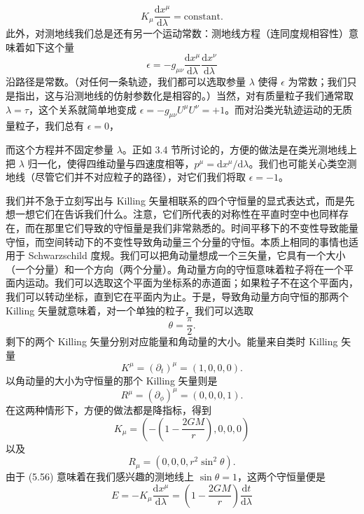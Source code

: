 \begin{equation*}
K_\mu\frac{\mathrm{d}x^\mu}{\mathrm{d}\lambda} = \mathrm{constant}.
\tag{5.54}
\end{equation*}
此外，对测地线我们总是还有另一个运动常数：测地线方程（连同度规相容性）意味着如下这个量
\begin{equation*}
\epsilon = -g_{\mu\nu}\frac{\mathrm{d}x^\mu}{\mathrm{d}\lambda}\frac{\mathrm{d}x^\nu}{\mathrm{d}\lambda}
\tag{5.55}
\end{equation*}
沿路径是常数。（对任何一条轨迹，我们都可以选取参量 $\lambda$ 使得 $\epsilon$ 为常数；我们只是指出，这与沿测地线的仿射参数化是相容的。）当然，对有质量粒子我们通常取 $\lambda = \tau$，这个关系就简单地变成 $\epsilon = -g_{\mu\nu}U^\mu U^\nu = +1$。而对沿类光轨迹运动的无质量粒子，我们总有 $\epsilon = 0$，

而这个方程并不固定参量 $\lambda$。正如 3.4 节所讨论的，方便的做法是在类光测地线上把 $\lambda$ 归一化，使得四维动量与四速度相等，$p^\mu = \mathrm{d}x^\mu/\mathrm{d}\lambda$。我们也可能关心类空测地线（尽管它们并不对应粒子的路径），对它们我们将取 $\epsilon = -1$。

我们并不急于立刻写出与 Killing 矢量相联系的四个守恒量的显式表达式，而是先想一想它们在告诉我们什么。注意，它们所代表的对称性在平直时空中也同样存在，而在那里它们导致的守恒量是我们非常熟悉的。时间平移下的不变性导致能量守恒，而空间转动下的不变性导致角动量三个分量的守恒。本质上相同的事情也适用于 Schwarzschild 度规。我们可以把角动量想成一个三矢量，它具有一个大小（一个分量）和一个方向（两个分量）。角动量方向的守恒意味着粒子将在一个平面内运动。我们可以选取这个平面为坐标系的赤道面；如果粒子不在这个平面内，我们可以转动坐标，直到它在平面内为止。于是，导致角动量方向守恒的那两个 Killing 矢量就意味着，对一个单独的粒子，我们可以选取
\begin{equation*}
\theta = \frac{\pi}{2}.
\tag{5.56}
\end{equation*}
剩下的两个 Killing 矢量分别对应能量和角动量的大小。能量来自类时 Killing 矢量
\begin{equation*}
K^\mu = (\partial_t)^\mu = (1, 0, 0, 0).
\tag{5.57}
\end{equation*}
以角动量的大小为守恒量的那个 Killing 矢量则是
\begin{equation*}
R^\mu = (\partial_\phi)^\mu = (0, 0, 0, 1).
\tag{5.58}
\end{equation*}
在这两种情形下，方便的做法都是降指标，得到
\begin{equation*}
K_\mu = \left(-\left(1-\frac{2GM}{r}\right), 0, 0, 0\right)
\tag{5.59}
\end{equation*}
以及
\begin{equation*}
R_\mu = \left(0, 0, 0, r^2\sin^2\theta\right).
\tag{5.60}
\end{equation*}
由于 (5.56) 意味着在我们感兴趣的测地线上 $\sin\theta = 1$，这两个守恒量便是
\begin{equation*}
E = -K_\mu\frac{\mathrm{d}x^\mu}{\mathrm{d}\lambda} = \left(1-\frac{2GM}{r}\right)\frac{\mathrm{d}t}{\mathrm{d}\lambda}
\tag{5.61}
\end{equation*}

